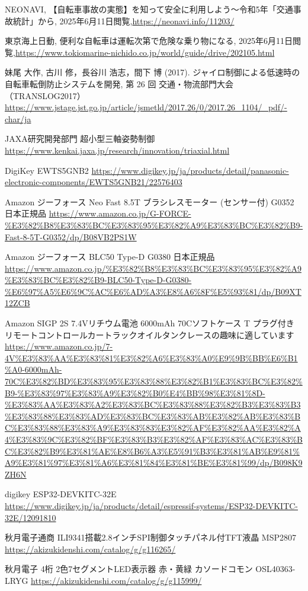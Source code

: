 \documentclass[uplatex,dvipdfmx]{jsarticle}
\begin{document}
\begin{thebibliography}{11}

 NEONAVI, 【自転車事故の実態】を知って安全に利用しよう～令和5年「交通事故統計」から, 
2025年6月11日閲覧,\url{https://neonavi.info/11203/}

 東京海上日動, 便利な自転車は運転次第で危険な乗り物になる, 
2025年6月11日閲覧,\url{https://www.tokiomarine-nichido.co.jp/world/guide/drive/202105.html}

 妹尾 大作, 古川 修，長谷川 浩志，間下 博 (2017). ジャイロ制御による低速時の
自転車転倒防止システムを開発, 第 26 回 交通・物流部門大会（TRANSLOG2017） 
\url{https://www.jstage.jst.go.jp/article/jsmetld/2017.26/0/2017.26_1104/_pdf/-char/ja}

JAXA研究開発部門 超小型三軸姿勢制御 
\url{https://www.kenkai.jaxa.jp/research/innovation/triaxial.html}


DigiKey EWTS5GNB2  \url{https://www.digikey.jp/ja/products/detail/panasonic-electronic-components/EWTS5GNB21/22576403}

Amazon ジーフォース Neo Fast 8.5T ブラシレスモーター (センサー付) G0352 日本正規品 \url{https://www.amazon.co.jp/G-FORCE-%E3%82%B8%E3%83%BC%E3%83%95%E3%82%A9%E3%83%BC%E3%82%B9-Fast-8-5T-G0352/dp/B08VB2PS1W}

Amazon ジーフォース BLC50 Type-D G0380 日本正規品
\url{https://www.amazon.co.jp/%E3%82%B8%E3%83%BC%E3%83%95%E3%82%A9%E3%83%BC%E3%82%B9-BLC50-Type-D-G0380-%E6%97%A5%E6%9C%AC%E6%AD%A3%E8%A6%8F%E5%93%81/dp/B09XT12ZCB}

Amazon SIGP 2S 7.4Vリチウム電池 6000mAh 70Cソフトケース T プラグ付き リモートコントロールカートラックオイルタンクレースの趣味に適しています
\url{https://www.amazon.co.jp/7-4V%E3%83%AA%E3%83%81%E3%82%A6%E3%83%A0%E9%9B%BB%E6%B1%A0-6000mAh-70C%E3%82%BD%E3%83%95%E3%83%88%E3%82%B1%E3%83%BC%E3%82%B9-%E3%83%97%E3%83%A9%E3%82%B0%E4%BB%98%E3%81%8D-%E3%83%AA%E3%83%A2%E3%83%BC%E3%83%88%E3%82%B3%E3%83%B3%E3%83%88%E3%83%AD%E3%83%BC%E3%83%AB%E3%82%AB%E3%83%BC%E3%83%88%E3%83%A9%E3%83%83%E3%82%AF%E3%82%AA%E3%82%A4%E3%83%9C%E3%82%BF%E3%83%B3%E3%82%AF%E3%83%AC%E3%83%BC%E3%82%B9%E3%81%AE%E8%B6%A3%E5%91%B3%E3%81%AB%E9%81%A9%E3%81%97%E3%81%A6%E3%81%84%E3%81%BE%E3%81%99/dp/B098K9ZH6N}

digikey ESP32-DEVKITC-32E \url{https://www.digikey.jp/ja/products/detail/espressif-systems/ESP32-DEVKITC-32E/12091810}

秋月電子通商 ILI9341搭載2.8インチSPI制御タッチパネル付TFT液晶 MSP2807
\url{https://akizukidenshi.com/catalog/g/g116265/}


秋月電子 4桁 2色7セグメントLED表示器 赤・黄緑 カソードコモン OSL40363-LRYG
\url{https://akizukidenshi.com/catalog/g/g115999/}

\end{thebibliography}
\end{document}
